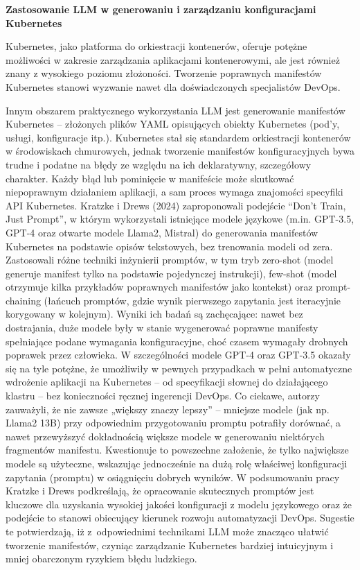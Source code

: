 \textbf{Zastosowanie LLM w generowaniu i zarządzaniu konfiguracjami Kubernetes}

Kubernetes, jako platforma do orkiestracji kontenerów, oferuje potężne możliwości w zakresie zarządzania aplikacjami kontenerowymi, ale jest również znany z wysokiego poziomu złożoności. Tworzenie poprawnych manifestów Kubernetes stanowi wyzwanie nawet dla doświadczonych specjalistów DevOps.

Innym obszarem praktycznego wykorzystania LLM jest generowanie manifestów Kubernetes – złożonych plików YAML opisujących obiekty Kubernetes (pod’y, usługi, konfiguracje itp.). Kubernetes stał się standardem orkiestracji kontenerów w środowiskach chmurowych, jednak tworzenie manifestów konfiguracyjnych bywa trudne i podatne na błędy ze względu na ich deklaratywny, szczegółowy charakter. Każdy błąd lub pominięcie w manifeście może skutkować niepoprawnym działaniem aplikacji, a sam proces wymaga znajomości specyfiki API Kubernetes. Kratzke i Drews (2024) zaproponowali podejście “Don’t Train, Just Prompt”, w którym wykorzystali istniejące modele językowe (m.in. GPT-3.5, GPT-4 oraz otwarte modele Llama2, Mistral) do generowania manifestów Kubernetes na podstawie opisów tekstowych, bez trenowania modeli od zera. Zastosowali różne techniki inżynierii promptów, w tym tryb zero-shot (model generuje manifest tylko na podstawie pojedynczej instrukcji), few-shot (model otrzymuje kilka przykładów poprawnych manifestów jako kontekst) oraz prompt-chaining (łańcuch promptów, gdzie wynik pierwszego zapytania jest iteracyjnie korygowany w kolejnym). Wyniki ich badań są zachęcające: nawet bez dostrajania, duże modele były w stanie wygenerować poprawne manifesty spełniające podane wymagania konfiguracyjne, choć czasem wymagały drobnych poprawek przez człowieka. W szczególności modele GPT-4 oraz GPT-3.5 okazały się na tyle potężne, że umożliwiły w pewnych przypadkach w pełni automatyczne wdrożenie aplikacji na Kubernetes – od specyfikacji słownej do działającego klastru – bez konieczności ręcznej ingerencji DevOps. Co ciekawe, autorzy zauważyli, że nie zawsze „większy znaczy lepszy” – mniejsze modele (jak np. Llama2 13B) przy odpowiednim przygotowaniu promptu potrafiły dorównać, a nawet przewyższyć dokładnością większe modele w generowaniu niektórych fragmentów manifestu. Kwestionuje to powszechne założenie, że tylko największe modele są użyteczne, wskazując jednocześnie na dużą rolę właściwej konfiguracji zapytania (promptu) w osiągnięciu dobrych wyników. W podsumowaniu pracy Kratzke i Drews podkreślają, że opracowanie skutecznych promptów jest kluczowe dla uzyskania wysokiej jakości konfiguracji z modelu językowego oraz że podejście to stanowi obiecujący kierunek rozwoju automatyzacji DevOps. Sugestie te potwierdzają, iż z odpowiednimi technikami LLM może znacząco ułatwić tworzenie manifestów, czyniąc zarządzanie Kubernetes bardziej intuicyjnym i mniej obarczonym ryzykiem błędu ludzkiego.

